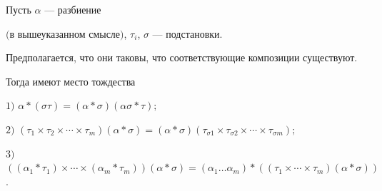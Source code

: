 \begin{lem} Пусть $\alpha$ --- разбиение


$($в вышеуказанном смысле$)$, $\tau_i$, $\sigma$ --- подстановки.


Предполагается, что они таковы, что соответствующие композиции существуют.


Тогда имеют место тождества





$1)$ $\alpha * (\sigma \tau)=(\alpha * \sigma)(\alpha\sigma * \tau);$





$2)$ $(\tau_1 \times \tau_2 \times \dotsb \times \tau_m)(\alpha * \sigma)=


(\alpha * \sigma)(\tau_{\sigma 1} \times \tau_{\sigma 2}\times\dotsb\times


\tau_{\sigma m});$





$3)$\ $((\alpha_1 * \tau_1)\times \dotsb\times


(\alpha_m * \tau_m))(\alpha * \sigma)=


(\alpha_1 \dotsc \alpha_m) * ((\tau_1 \times \dotsb


\times \tau_m)(\alpha * \sigma))$.


\end{lem}





